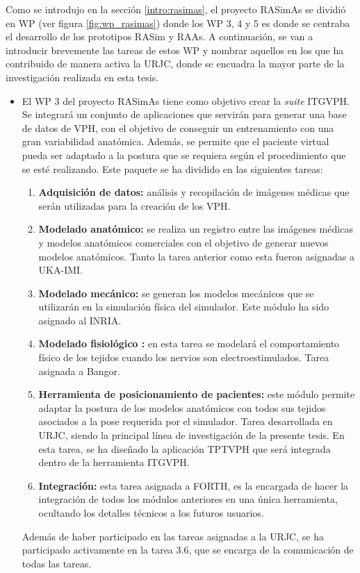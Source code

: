 Como se introdujo en la sección \ref{intro:rasimas}, el proyecto \ac{RASimAs} se dividió en \acl{WP} (ver figura \ref{fig:wp_rasimas}) donde los \ac{WP} 3, 4 y 5 es donde se centraba el desarrollo de los prototipos \ac{RASim} y \ac{RAAs}. 
A continuación, se van a introducir brevemente las tareas de estos \acl{WP} y nombrar aquellos en los que ha contribuido de manera activa la \ac{URJC}, donde se encuadra la mayor parte de la investigación realizada en esta tesis. 


\begin{itemize}
    \item 
El \ac{WP} 3 del proyecto \ac{RASimAs} tiene como objetivo crear la \emph{suite} \ac{ITGVPH}. Se integrará un conjunto de aplicaciones que servirán para generar una base de datos de \ac{VPH}, con el objetivo de conseguir un entrenamiento con una gran variabilidad anatómica. Además, se permite que el paciente virtual pueda ser adaptado a la postura que se requiera según el procedimiento que se esté realizando. Este paquete se ha dividido en las siguientes tareas:%
\begin{enumerate}
    \item \textbf{Adquisición de datos:} análisis y recopilación de imágenes médicas que serán utilizadas para la creación de los \ac{VPH}.
    \item \textbf{Modelado anatómico:} se realiza un registro entre las imágenes médicas y modelos anatómicos comerciales con el objetivo de generar nuevos modelos anatómicos.
    Tanto la tarea anterior como esta fueron asignadas a \ac{UKA-IMI}.
    \item \textbf{Modelado mecánico:} se generan los modelos mecánicos que se utilizarán en la simulación física del simulador. Este módulo ha sido asignado al \ac{INRIA}.
    \item \textbf{Modelado fisiológico :} en esta tarea se modelará el comportamiento físico de los tejidos cuando los nervios son electroestimulados.
    Tarea asignada a \ac{Bangor}.
    \item \textbf{Herramienta de posicionamiento de pacientes:} este módulo permite adaptar la postura de los modelos anatómicos con todos sus tejidos asociados a la pose requerida por el simulador. Tarea desarrollada en \ac{URJC}, siendo la principal línea de investigación de la presente tesis. En esta tarea, se ha diseñado la aplicación \ac{TPTVPH} que será integrada dentro de la herramienta \ac{ITGVPH}.
    \item {\textbf{Integración:}
    esta tarea asignada a \ac{FORTH}, es la encargada de hacer la integración de todos los módulos anteriores en una única herramienta, ocultando los detalles técnicos a los futuros usuarios.}
\end{enumerate}
{Además de haber participado en las tareas asignadas a la \ac{URJC}, se ha participado activamente en la tarea 3.6, que se encarga de la comunicación de todas las tareas.}


\end{itemize}
